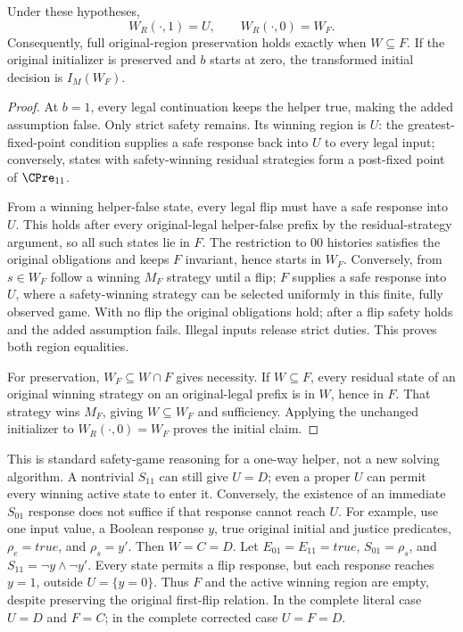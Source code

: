 \begin{proposition}
\label{prop:general-helper}
Under these hypotheses,
\[
 W_R(\cdot,1)=U,\qquad W_R(\cdot,0)=W_F.
\]
Consequently, full original-region preservation holds exactly when
$W\subseteq F$. If the original initializer is preserved and $b$
starts at zero, the transformed initial decision is $I_M(W_F)$.
\end{proposition}
\begin{proof}
At $b=1$, every legal continuation keeps the helper true, making the
added assumption false. Only strict safety remains. Its winning region
is $U$: the greatest-fixed-point condition supplies a safe response back
into $U$ to every legal input; conversely, states with safety-winning
residual strategies form a post-fixed point of $\CPre_{11}$.

From a winning helper-false state, every legal flip must have a safe
response into $U$. This holds after every original-legal helper-false
prefix by the residual-strategy argument, so all such states lie in $F$.
The restriction to $00$ histories satisfies the original obligations
and keeps $F$ invariant, hence starts in $W_F$.
Conversely, from $s\in W_F$ follow a winning $M_F$ strategy until a flip;
$F$ supplies a safe response into $U$, where a safety-winning strategy
can be selected uniformly in this finite, fully observed game. With no
flip the original obligations hold; after a flip safety holds and the
added assumption fails. Illegal inputs release strict duties.
This proves both region equalities.

For preservation, $W_F\subseteq W\cap F$ gives necessity. If
$W\subseteq F$, every residual state of an original winning strategy
on an original-legal prefix is in $W$, hence in $F$. That strategy wins
$M_F$, giving $W\subseteq W_F$ and sufficiency. Applying the unchanged
initializer to $W_R(\cdot,0)=W_F$ proves the initial claim.
\end{proof}

This is standard safety-game reasoning for a one-way helper,
not a new solving algorithm.
A nontrivial $S_{11}$ can still give $U=D$; even a proper $U$ can
permit every winning active state to enter it. Conversely, the
existence of an immediate $S_{01}$ response does not suffice if
that response cannot reach $U$. For example, use one input value,
a Boolean response $y$, true original initial and justice predicates,
$\rho_e=\mathit{true}$, and $\rho_s=y'$. Then $W=C=D$.
Let $E_{01}=E_{11}=\mathit{true}$,
$S_{01}=\rho_s$, and $S_{11}=\neg y\land\neg y'$.
Every state permits a flip response, but each response reaches
$y=1$, outside $U=\{y=0\}$. Thus $F$ and the active winning region
are empty, despite preserving the original first-flip relation.
In the complete literal case $U=D$ and $F=C$; in the
complete corrected case $U=F=D$.
